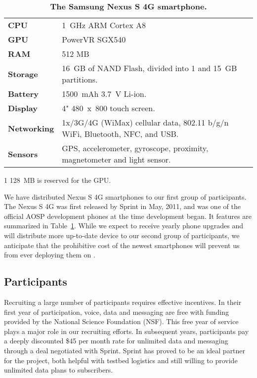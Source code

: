 \begin{table}[t]
\begin{threeparttable}
\begin{tabularx}{\columnwidth}{lX}
\toprule
\textbf{CPU} & 1~GHz ARM Cortex A8 \\
\textbf{GPU} & PowerVR SGX540 \\
\textbf{RAM} & 512 MB\tnote{1} \\
\textbf{Storage} & 16~GB of NAND Flash, divided into 1 and 15~GB partitions.\\
\textbf{Battery} & \num{1500}~mAh 3.7~V Li-ion.\\
\textbf{Display} & 4" 480~x~800 touch screen.\\
\textbf{Networking} & 1x/3G/4G (WiMax) cellular data, 802.11 b/g/n WiFi,
Bluetooth, NFC, and USB.\\
\textbf{Sensors} & GPS, accelerometer, gyroscope, proximity, magnetometer and light sensor.\\
\bottomrule
\end{tabularx}

{\footnotesize
\begin{tablenotes}
\item [1] 128~MB is reserved for the GPU.
\end{tablenotes}}

\caption{\textbf{The Samsung Nexus S 4G smartphone.}}
\label{table-nexuss4g}
\end{threeparttable}
\end{table}

We have distributed Nexus S 4G smartphones to our first group of
participants. The Nexus S 4G was first released by Sprint in May, 2011, and
was one of the official AOSP development phones at the time \PhoneLab{}
development began. It features are summarized in Table~\ref{table-nexuss4g}.
While we expect to receive yearly phone upgrades and will distribute more
up-to-date device to our second group of participants, we anticipate that the
prohibitive cost of the newest smartphones will prevent us from ever
deploying them on \PhoneLab{}.

\subsection{Participants}

Recruiting a large number of \PhoneLab{} participants requires effective
incentives. In their first year of \PhoneLab{} participation, voice, data and
messaging are free with funding provided by the National Science Foundation
(NSF). This free year of service plays a major role in our recruiting
efforts. In subsequent years, participants pay a deeply discounted \$45 per
month rate for unlimited data and messaging through a deal negotiated with
Sprint. Sprint has proved to be an ideal partner for the \PhoneLab{} project,
both helpful with testbed logistics and still willing to provide unlimited
data plans to subscribers.

